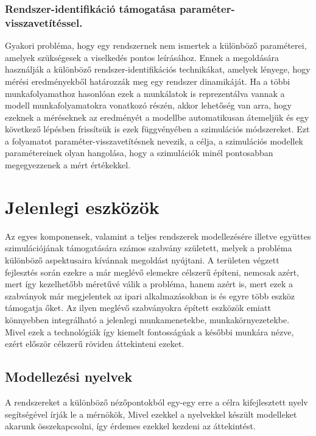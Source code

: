         \subsubsection{Rendszer-identifikáció támogatása paraméter-visszavetítéssel.}
        Gyakori probléma, hogy egy rendszernek nem ismertek a különböző paraméterei, amelyek szükségesek a viselkedés pontos leírásához.
        Ennek a megoldására használják a különböző rendszer-identifikációs technikákat, amelyek lényege, hogy mérési eredményekből határozzák meg egy rendszer dinamikáját.
        Ha a többi munkafolyamathoz hasonlóan ezek a munkálatok is reprezentálva vannak a modell munkafolyamatokra vonatkozó részén, akkor lehetőség van arra,
        hogy ezeknek a méréseknek az eredményét a modellbe automatikusan átemeljük és egy következő lépésben frissítsük is ezek függvényében a szimulációs módszereket.
        Ezt a folyamatot paraméter-visszavetítésnek nevezik, a célja, a szimulációs modellek paramétereinek olyan hangolása, hogy a szimulációk minél pontosabban megegyezzenek a mért értékekkel.

\section{Jelenlegi eszközök}
Az egyes komponensek, valamint a teljes rendszerek modellezésére illetve együttes szimulációjának támogatására számos
szabvány született, melyek a probléma különböző aspektusaira kívánnak megoldást nyújtani. A területen végzett fejlesztés során
ezekre a már meglévő elemekre célszerű építeni, nemcsak azért, mert így kezelhetőbb méretűvé válik a probléma, hanem azért is,
mert ezek a szabványok már megjelentek az ipari alkalmazásokban is és egyre több eszköz támogatja őket.
Az ilyen meglévő szabványokra épített eszközök emiatt könnyebben integrálható a jelenlegi munkamenetekbe,
munkakörnyezetekbe. Mivel ezek a technológiák így kiemelt fontosságúak a későbbi munkára nézve, ezért
először célszerű röviden áttekinteni ezeket.

    \subsection{Modellezési nyelvek}
    A rendszereket a különböző nézőpontokból egy-egy erre a célra kifejlesztett nyelv segítségével írják le a mérnökök,
    Mivel ezekkel a nyelvekkel készült modelleket akarunk összekapcsolni, így érdemes ezekkel kezdeni az áttekintést.
        
